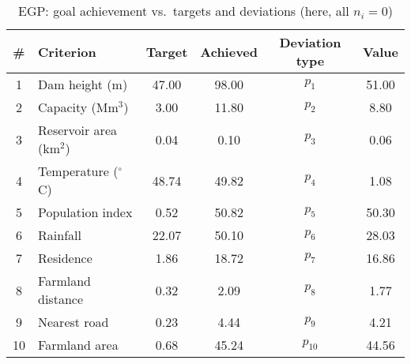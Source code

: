 \begin{table}[htbp]
\centering
\caption{EGP: goal achievement vs.\ targets and deviations (here, all $n_i=0$)}
\label{tab:egpAchievementVsTarget}
\begin{tabular}{clcccc}
\hline
\textbf{\#} & \textbf{Criterion} & \textbf{Target} & \textbf{Achieved} & \textbf{Deviation type} & \textbf{Value} \\
\hline
1  & Dam height (m)              & 47.00 & 98.00  & $p_{1}$  & 51.00  \\
2  & Capacity (Mm$^{3}$)         & 3.00  & 11.80  & $p_{2}$  & 8.80   \\
3  & Reservoir area (km$^{2}$)   & 0.04  & 0.10   & $p_{3}$  & 0.06   \\
4  & Temperature ($^{\circ}$C)    & 48.74 & 49.82  & $p_{4}$  & 1.08   \\
5  & Population index            & 0.52  & 50.82  & $p_{5}$  & 50.30  \\
6  & Rainfall                    & 22.07 & 50.10  & $p_{6}$  & 28.03  \\
7  & Residence                   & 1.86  & 18.72  & $p_{7}$  & 16.86  \\
8  & Farmland distance           & 0.32  & 2.09   & $p_{8}$  & 1.77   \\
9  & Nearest road                & 0.23  & 4.44   & $p_{9}$  & 4.21   \\
10 & Farmland area               & 0.68  & 45.24  & $p_{10}$ & 44.56  \\
\hline
\end{tabular}
\end{table}
